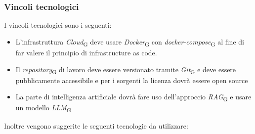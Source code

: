 \subsubsection{Vincoli tecnologici}
I vincoli tecnologici sono i seguenti:
\begin{itemize}
    \item L’infrastruttura \textit{Cloud}\textsubscript{G} deve usare \textit{Docker}\textsubscript{G} con \textit{docker-compose}\textsubscript{G} al fine di far valere il
    principio di infrastructure as code.
    \item Il \textit{repository}\textsubscript{G} di lavoro deve essere versionato tramite \textit{Git}\textsubscript{G} e deve essere pubblicamente
    accessibile e per i sorgenti la licenza dovrà essere open
    source
    \item La parte di intelligenza artificiale dovrà fare uso dell’approccio \textit{RAG}\textsubscript{G} e usare un modello \textit{LLM}\textsubscript{G}
\end{itemize}
Inoltre vengono suggerite le seguenti tecnologie da utilizzare:
